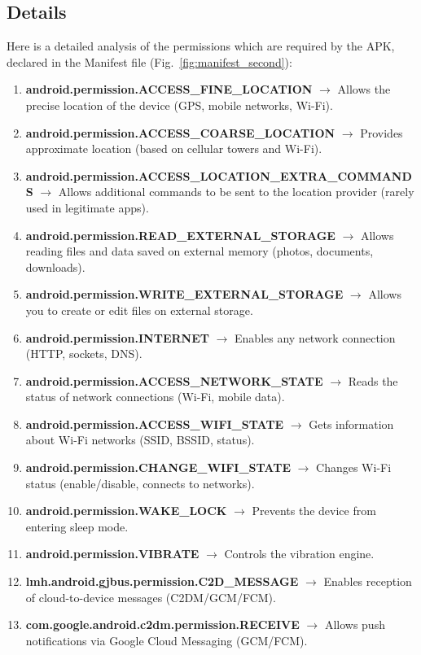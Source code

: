 \subsection{Details}
Here is a detailed analysis of the permissions which are required by the APK, declared in the Manifest file (Fig.\ \ref{fig:manifest_second}):
\begin{enumerate}
\item \textbf{android.permission.ACCESS\_FINE\_LOCATION} $\rightarrow$ Allows the precise location of the device (GPS, mobile networks, Wi-Fi).
\item \textbf{android.permission.ACCESS\_COARSE\_LOCATION} $\rightarrow$ Provides approximate location (based on cellular towers and Wi-Fi).
\item \textbf{android.permission.ACCESS\_LOCATION\_EXTRA\_COMMANDS} $\rightarrow$ Allows additional commands to be sent to the location provider (rarely used in legitimate apps).
\item \textbf{android.permission.READ\_EXTERNAL\_STORAGE} $\rightarrow$ Allows reading files and data saved on external memory (photos, documents, downloads).
\item \textbf{android.permission.WRITE\_EXTERNAL\_STORAGE} $\rightarrow$ Allows you to create or edit files on external storage.
\item \textbf{android.permission.INTERNET} $\rightarrow$ Enables any network connection (HTTP, sockets, DNS).
\item \textbf{android.permission.ACCESS\_NETWORK\_STATE} $\rightarrow$ Reads the status of network connections (Wi-Fi, mobile data).
\item \textbf{android.permission.ACCESS\_WIFI\_STATE} $\rightarrow$ Gets information about Wi-Fi networks (SSID, BSSID, status).
\item \textbf{android.permission.CHANGE\_WIFI\_STATE} $\rightarrow$ Changes Wi-Fi status (enable/disable, connects to networks).
\item \textbf{android.permission.WAKE\_LOCK} $\rightarrow$ Prevents the device from entering sleep mode.
\item \textbf{android.permission.VIBRATE} $\rightarrow$ Controls the vibration engine.
\item \textbf{lmh.android.gjbus.permission.C2D\_MESSAGE} $\rightarrow$ Enables reception of cloud-to-device messages (C2DM/GCM/FCM).
\item \textbf{com.google.android.c2dm.permission.RECEIVE} $\rightarrow$ Allows push notifications via Google Cloud Messaging (GCM/FCM).
\end{enumerate}

